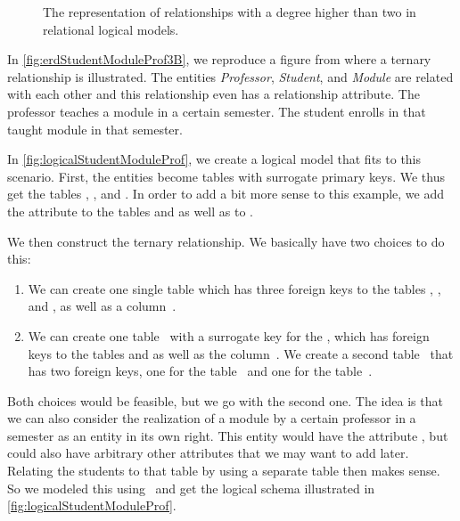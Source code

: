 %
%
\begin{figure}%
\centering%
%
%
%
\floatRowSep%
%
%
%
\caption{The representation of relationships with a degree higher than two in relational logical models.}%
\label{fig:logicalStudentModuleProfII}%
\end{figure}%
%
In \cref{fig:erdStudentModuleProf3B}, we reproduce a figure from  where a ternary relationship is illustrated.
The entities \emph{Professor}, \emph{Student}, and \emph{Module} are related with each other and this relationship even has a relationship attribute.
The professor teaches a module in a certain semester.
The student enrolls in that taught module in that semester.

In \cref{fig:logicalStudentModuleProf}, we create a logical model that fits to this scenario.
First, the entities become tables with surrogate primary keys.
We thus get the tables , , and .
In order to add a bit more sense to this example, we add the attribute  to the tables  and  as well as  to .

We then construct the ternary relationship.
We basically have two choices to do this:%
%
\begin{enumerate}%
%
\item We can create one single table  which has three foreign keys to the tables , , and , as well as a column~.%
%
\item We can create one table~ with a surrogate key for the , which has foreign keys to the tables  and  as well as the column~. %
We create a second table~ that has two foreign keys, one for the table~ and one for the table~.%
%
\end{enumerate}%
%
Both choices would be feasible, but we go with the second one.
The idea is that we can also consider the realization of a module by a certain professor in a semester as an entity in its own right.
This entity would have the attribute , but could also have arbitrary other attributes that we may want to add later.
Relating the students to that  table by using a separate table then makes sense.
So we modeled this using \pgmodeler\ and get the logical schema illustrated in \cref{fig:logicalStudentModuleProf}.

